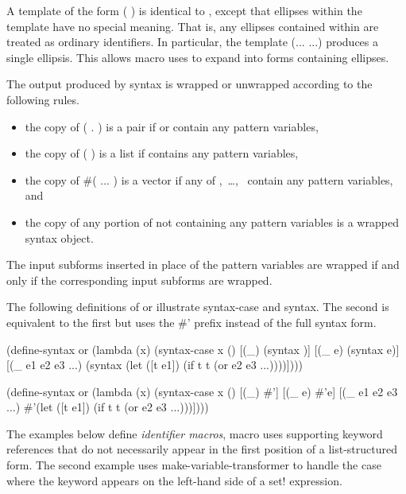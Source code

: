 \begin{entry}{%
}
A template of the form
{\cf ( )} is identical to , except that
ellipses within the template have no special meaning.
That is, any ellipses contained within  are
treated as ordinary identifiers.
In particular, the template {\cf (... ...)} produces a single
ellipsis.
This allows macro uses to expand into forms containing
ellipses.

\label{wrappingrules}
The output produced by {\cf syntax} is wrapped or unwrapped according to
the following rules.

\begin{itemize}
\item the copy of {\cf ( .  )} is a pair if 
      or  contain any pattern variables,
\item the copy of {\cf ( )} is a list if 
      contains any pattern variables,
\item the copy of {\cf \#( ... )} is a vector if any of
      ,~\dots,~ contain any pattern variables, and
\item the copy of any portion of  not containing any pattern variables
      is a wrapped syntax object.
\end{itemize}

The input subforms inserted in place of the pattern variables are wrapped
if and only if the corresponding input subforms are wrapped.
\end{entry}

The following definitions of {\cf or} illustrate {\cf syntax-case}
and {\cf syntax}.
The second is equivalent to the first but uses the {\cf \#'}
prefix instead of the full {\cf syntax} form.

\begin{schemenoindent}
(define-syntax or
  (lambda (x)
    (syntax-case x ()
      [(\_) (syntax \schfalse{})]
      [(\_ e) (syntax e)]
      [(\_ e1 e2 e3 ...)
       (syntax (let ([t e1])
                 (if t t (or e2 e3 ...))))])))

(define-syntax or
  (lambda (x)
    (syntax-case x ()
      [(\_) \#'\schfalse{}]
      [(\_ e) \#'e]
      [(\_ e1 e2 e3 ...)
       \#'(let ([t e1])
           (if t t (or e2 e3 ...)))])))
\end{schemenoindent}

The examples below define \emph{identifier macros}, macro uses
supporting keyword references that do not necessarily appear in the first
position of a list-structured form.
The second example uses {\cf make-variable-transformer} to handle the case
where the keyword appears on the left-hand side of a
{\cf set!} expression.

